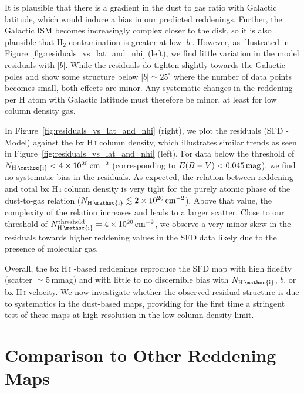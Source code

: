 \documentclass[iop,apj]{emulateapj}
\makeatletter
\def\testbx{bx}%
\DeclareRobustCommand{\ion}[2]{%
\relax\ifmmode
\ifx\testbx\f@series
{\mathbf{#1\,\mathsc{#2}}}\else
{\mathrm{#1\,\mathsc{#2}}}\fi
\else\textup{#1\,{\mdseries\textsc{#2}}}%
\fi}
\makeatother
\begin{document}
It is plausible that there is a gradient in the dust to gas ratio with Galactic latitude, which would induce a bias in our predicted reddenings. Further, the Galactic ISM becomes increasingly complex closer to the disk, so it is also plausible that H$_2$ contamination is greater at low $|b|$. However, as illustrated in Figure~\ref{fig:residuals_vs_lat_and_nhi} (left), we find little variation in the model residuals with $|b|$. While the residuals do tighten slightly towards the Galactic poles and show some structure below $|b| \simeq 25^\circ$ where the number of data points becomes small, both effects are minor. Any systematic changes in the reddening per H atom with Galactic latitude must therefore be minor, at least for low column density gas.

In Figure~\ref{fig:residuals_vs_lat_and_nhi} (right), we plot the residuals (SFD - Model) against the \ion{H}{i} column density, which illustrates similar trends as seen in Figure~\ref{fig:residuals_vs_lat_and_nhi} (left). For data below the threshold of $N_{\ion{H}{i}} < 4\times 10^{20}\,\rm cm^{-2}$ (corresponding to $E(B-V) < 0.045\,\rm mag$), we find no systematic bias in the residuals. As expected, the relation between reddening and total \ion{H}{i} column density is very tight for the purely atomic phase of the dust-to-gas relation ($N_{\ion{H}{i}}\lesssim 2\times 10^{20}\,\rm cm^{-2}$). Above that value, the complexity of the relation increases and leads to a larger scatter. Close to our threshold of $N^{\rm threshold}_{\ion{H}{i}} = 4\times 10^{20}\,\rm cm^{-2}$, we observe a very minor skew in the residuals towards higher reddening values in the SFD data likely due to the presence of molecular gas.

Overall, the \ion{H}{i}-based reddenings reproduce the SFD map with high fidelity (scatter $\simeq 5$\,mmag) and with little to no discernible bias with $N_\ion{H}{i}$, $b$, or \ion{H}{i} velocity. We now investigate whether the observed residual structure is due to systematics in the dust-based maps, providing for the first time a stringent test of these maps at high resolution in the low column density limit.

\section{Comparison to Other Reddening Maps}
\label{sec:compare}
\end{document}
